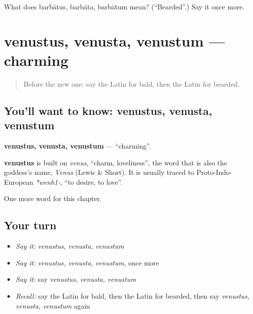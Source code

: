 \begin{tcolorbox}[breakable,colback=teal!4,colframe=teal!35!black,title={Before you move on}]
What does barbātus, barbāta, barbātum mean? (\textquotedblleft{}Bearded\textquotedblright{}.) Say it once more.
\end{tcolorbox}
\section[venustus, venusta, venustum]{venustus, venusta, venustum — charming}

\label{lesson:LA-C216-venustus}



\begin{quote}
Before the new one: say the Latin for bald, then the Latin for bearded.
\end{quote}

\subsection*{You'll want to know: venustus, venusta, venustum}
\textbf{venustus, venusta, venustum} — \textquotedblleft{}charming\textquotedblright{}.

\begin{cousinweb}
\textbf{venustus} is built on \emph{venus}, \textquotedblleft{}charm, loveliness\textquotedblright{}, the word that is also the goddess's name, \emph{Venus} (Lewis \& Short). It is usually traced to Proto-Indo-European \emph{*wenh1-}, \textquotedblleft{}to desire, to love\textquotedblright{}.
\end{cousinweb}

\begin{grammarlens}[title={What you've built}]
One more word for this chapter.
\end{grammarlens}

\subsection*{Your turn}
\begin{itemize}
\raggedright
  \item \emph{Say it:} \emph{venustus, venusta, venustum}
  \item \emph{Say it:} \emph{venustus, venusta, venustum}, once more
  \item \emph{Say it:} say \emph{venustus, venusta, venustum}
  \item \emph{Recall:} say the Latin for bald, then the Latin for bearded, then say \emph{venustus, venusta, venustum} again
\end{itemize}

